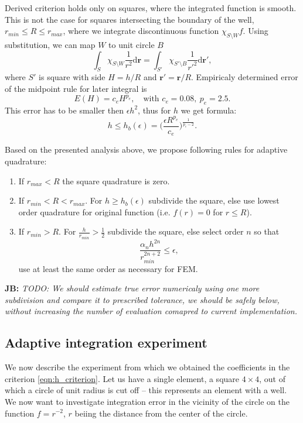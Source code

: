 \documentclass[preprint,12pt]{elsarticle}
\def\vc#1{\mathbf{\boldsymbol{#1}}}     %
\def\d{\mathrm{d}}
\newcommand{\noteJB}[1]{{\color{Blue} \textbf{JB: } \textit{#1}}}
\begin{document}
Derived criterion holds only on squares, where the integrated function is smooth.
This is not the case for squares intersecting the boundary of the well, $r_{min} \le R \le r_{max}$, where we integrate 
discontinuous function $\chi_{S \setminus W} f$. Using substitution, we can map $W$ to unit circle $B$
\[
  \int_{S} \chi_{S \setminus W} \frac{1}{r^2} \d \vc r= \int_{S'} \chi_{S' \setminus B} \frac{1}{r'^2} \d \vc {r'},
\]
where $S'$ is square with side $H=h/R$ and $\vc {r'} = \vc{r}/R$. Empiricaly determined error of the midpoint rule for later 
integral is
\[
    E(H) = c_e H^{p_e}, \quad \text{with } c_e=0.08,\ p_e=2.5.
\]
This error has to be smaller then $\epsilon h^2$, thus for $h$ we get formula:
\begin{equation} \label{eqn:h_criterion}
   h\le h_b(\epsilon) = \Big(\frac{\epsilon R^{p_e}}{c_e}\Big)^{\frac{1}{p_e-2}}. 
\end{equation}


Based on the presented analysis above, we propose following rules for adaptive quadrature:
\begin{enumerate}
 \item If $r_{max} < R$ the square quadrature is zero.
 \item If $r_{min} < R < r_{max}$. For $h \ge h_b(\epsilon)$ subdivide the square, else use lowest order quadrature for 
original function (i.e. $f(r)=0$ for $r\le R$).
 \item If $r_{min} > R$. For $\frac{h}{r_{min}} > \frac{1}{2}$ subdivide the square, else select order $n$ so that 
 \begin{equation} \label{eqn:alpha_criterion}
    \frac{\alpha_n h^{2n}}{r_{min}^{2n+2}} \le \epsilon,
 \end{equation}
 use at least the same order as necessary for FEM.
\end{enumerate}

\noteJB{TODO:
We should estimate true error numericaly using one more subdivision and compare it to prescribed tolerance, we should be safely 
below, without increasing the number of evaluation comapred to current implementation.
}


\subsection{Adaptive integration experiment}
We now describe the experiment from which we obtained the coefficients in the criterion 
\eqref{eqn:h_criterion}. Let us have a single element, a square $4\times4$, out of which a circle of unit radius 
is cut off -- this represents an element with a well. We now want to investigate integration error
in the vicinity of the circle on the function $f=r^{-2}$, $r$ beiing the distance from the center of the circle. 
\end{document}
